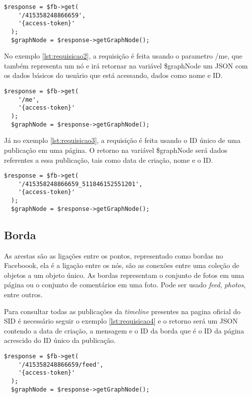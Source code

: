 \begin{lstlisting}[caption={Requisitando dados básicos de uma página},label={lst:requisicao1}]
  $response = $fb->get(
    '/415358248866659',
    '{access-token}'
  );
  $graphNode = $response->getGraphNode();
\end{lstlisting}

No exemplo \ref{lst:requisicao2}, a requisição é feita usando o parametro /me, que também representa um nó e irá retornar na variável \$graphNode um JSON com os dados básicos do usuário que está acessando, dados como nome e ID.

\begin{lstlisting}[caption={Requisitando dados básicos de um usuário},label={lst:requisicao2}]
  $response = $fb->get(
    '/me',
    '{access-token}'
  );
  $graphNode = $response->getGraphNode();
\end{lstlisting}

Já no exemplo \ref{lst:requisicao3}, a requisição é feita usando o ID único de uma publicação em uma página. O retorno na variável \$graphNode será dados referentes a essa publicação, tais como data de criação, nome e o ID.

\begin{lstlisting}[caption={Requisitando dados básicos de uma publicação},label={lst:requisicao3}]
  $response = $fb->get(
    '/415358248866659_511846152551201',
    '{access-token}'
  );
  $graphNode = $response->getGraphNode();
\end{lstlisting}

\subsection{Borda}
As arestas são as ligações entre os pontos, representado como bordas no Faceboook, ela é a ligação entre os nós, são as conexões entre uma coleção de objetos a um objeto único. As bordas representam o conjunto de fotos em uma página ou o conjunto de comentários em uma foto. Pode ser usado \textit{feed}, \textit{photos}, entre outros.

Para consultar todas as publicações da \textit{timeline} presentes na pagina oficial do SID é necessário seguir o exemplo \ref{lst:requisicao4} e o retorno será um JSON contendo a data de criação, a mensagem e o ID da borda que é o ID da página acrescido do ID único da publicação.

\begin{lstlisting}[caption={Requisitando todas as publicações de uma página},label={lst:requisicao4}]
  $response = $fb->get( 
    '/415358248866659/feed', 
    '{access-token}'
  );
  $graphNode = $response->getGraphNode();
\end{lstlisting}

